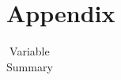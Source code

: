 \documentclass[a4paper]{article}\usepackage{graphicx, color}
\begin{document}




\theendnotes


\clearpage
\section*{Appendix}


\begin{table}[!h]
    \begin{center}
    \caption{Variable Summary}
    \label{var_summary}
    \begin{tabular}{l m{7cm} m{3.5cm}}


\end{tabular}
\end{center}
\end{table}
\end{document}
